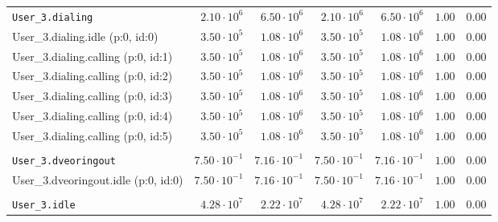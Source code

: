 \begin{table}[htbp]
{\begin{tabular}{lrrrrrr}
\\[-8pt]\texttt{User\_3.dialing}                      &  $2.10 \cdot 10^{6}$ &  $6.50 \cdot 10^{6}$ &  $2.10 \cdot 10^{6}$ &  $6.50 \cdot 10^{6}$ &               $1.00$ &               $0.00$ \\
\hspace{3mm}User\_3.dialing.idle (p:0, id:0)          &  $3.50 \cdot 10^{5}$ &  $1.08 \cdot 10^{6}$ &  $3.50 \cdot 10^{5}$ &  $1.08 \cdot 10^{6}$ &               $1.00$ &               $0.00$ \\
\hspace{3mm}User\_3.dialing.calling (p:0, id:1)       &  $3.50 \cdot 10^{5}$ &  $1.08 \cdot 10^{6}$ &  $3.50 \cdot 10^{5}$ &  $1.08 \cdot 10^{6}$ &               $1.00$ &               $0.00$ \\
\hspace{3mm}User\_3.dialing.calling (p:0, id:2)       &  $3.50 \cdot 10^{5}$ &  $1.08 \cdot 10^{6}$ &  $3.50 \cdot 10^{5}$ &  $1.08 \cdot 10^{6}$ &               $1.00$ &               $0.00$ \\
\hspace{3mm}User\_3.dialing.calling (p:0, id:3)       &  $3.50 \cdot 10^{5}$ &  $1.08 \cdot 10^{6}$ &  $3.50 \cdot 10^{5}$ &  $1.08 \cdot 10^{6}$ &               $1.00$ &               $0.00$ \\
\hspace{3mm}User\_3.dialing.calling (p:0, id:4)       &  $3.50 \cdot 10^{5}$ &  $1.08 \cdot 10^{6}$ &  $3.50 \cdot 10^{5}$ &  $1.08 \cdot 10^{6}$ &               $1.00$ &               $0.00$ \\
\hspace{3mm}User\_3.dialing.calling (p:0, id:5)       &  $3.50 \cdot 10^{5}$ &  $1.08 \cdot 10^{6}$ &  $3.50 \cdot 10^{5}$ &  $1.08 \cdot 10^{6}$ &               $1.00$ &               $0.00$ \\
\\[-8pt]\texttt{User\_3.dveoringout}                  & $7.50 \cdot 10^{-1}$ & $7.16 \cdot 10^{-1}$ & $7.50 \cdot 10^{-1}$ & $7.16 \cdot 10^{-1}$ &               $1.00$ &               $0.00$ \\
\hspace{3mm}User\_3.dveoringout.idle (p:0, id:0)      & $7.50 \cdot 10^{-1}$ & $7.16 \cdot 10^{-1}$ & $7.50 \cdot 10^{-1}$ & $7.16 \cdot 10^{-1}$ &               $1.00$ &               $0.00$ \\
\\[-8pt]\texttt{User\_3.idle}                         &  $4.28 \cdot 10^{7}$ &  $2.22 \cdot 10^{7}$ &  $4.28 \cdot 10^{7}$ &  $2.22 \cdot 10^{7}$ &               $1.00$ &               $0.00$ \\

\end{tabular}}
\end{table}
